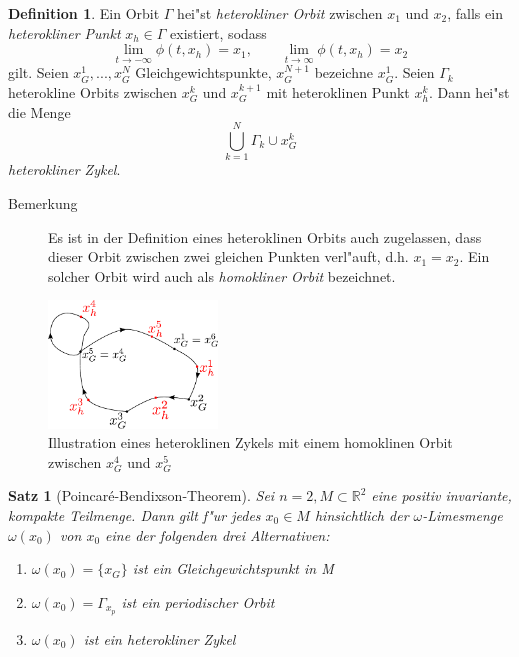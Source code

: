 \documentclass[a4paper, 13pt]{scrreprt}
\newtheorem{satz}{Satz}[section]
\theoremstyle{definition} \newtheorem{definition}{Definition}[section]
\begin{document}
\begin{definition}
Ein Orbit $\Gamma$ hei"st \emph{heterokliner Orbit} zwischen $x_1$ und $x_2$, falls ein \emph{heterokliner Punkt} $x_h \in \Gamma$ existiert, sodass 
\[\lim_{t\to -\infty} \phi(t,x_h) = x_1,\qquad \lim_{t\to\infty} \phi(t,x_h) = x_2\]
gilt. Seien \(x_G^1,...,x_G^N\) Gleichgewichtspunkte, $x_G^{N+1}$ bezeichne $x_G^1$. Seien $\Gamma_{k}$ heterokline Orbits zwischen $x_G^k$ und $x_G^{k+1}$ mit heteroklinen Punkt $x_h^k$. Dann hei"st die Menge 
	$$	\bigcup_{k=1}^{N} \Gamma_k \cup x_G^k$$
\emph{heterokliner Zykel}.
\end{definition}
\begin{description}
\item[Bemerkung] Es ist in der Definition eines heteroklinen Orbits auch zugelassen, dass dieser Orbit zwischen zwei gleichen Punkten verl"auft, d.h. $x_1 = x_2$. Ein solcher Orbit wird auch als \emph{homokliner Orbit} bezeichnet.
\end{description}
\begin{figure}[htpb]
		\centering
		\includegraphics[width=0.4\textwidth]{img/poincare_Bendixson/heterokline_orbits.pdf}
		\caption{Illustration eines heteroklinen Zykels mit einem homoklinen Orbit zwischen $x_G^4$ und $x_G^5$}
\end{figure}


\begin{satz}[Poincar\'{e}-Bendixson-Theorem]
	Sei \(n=2, M \subset \mathbb{R}^2\) eine positiv invariante, kompakte Teilmenge. Dann gilt f"ur jedes \(x_0 \in M\) hinsichtlich der \(\omega\)-Limesmenge \(\omega(x_0)\) von \(x_0\) eine der folgenden drei Alternativen:
	\begin{enumerate}
		\item \(\omega (x_0) = \{x_G\} \) ist ein Gleichgewichtspunkt in M
		\item \(\omega(x_0) = \Gamma_{x_p}\) ist ein periodischer Orbit
		\item \(\omega(x_0)\) ist ein heterokliner Zykel
	\end{enumerate}

\end{satz}
\end{document}
